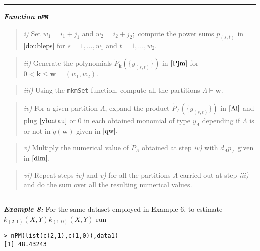 \noindent

\rule{13cm}{0.4pt}

\textbf{\emph{Function \texttt{nPM}}}

\begin{quote}
\emph{i)} Set \(w_1=i_1+j_1\) and \(w_2=i_2+j_2;\) compute the power
sums \(p_{(s,t)}\) in \eqref{doubleps} for \(s=1, \ldots, w_1\) and
\(t=1, \ldots, w_2.\)
\end{quote}

\begin{quote}
\emph{ii)} Generate the polynomials
\(\tilde{P}_{\boldsymbol{k}} \left( \{y_{(s,t)}\} \right)\) in
\(\eqref{Pjm}\) for \(0<\boldsymbol{k} \leq \boldsymbol{w}=(w_1,w_2).\)
\end{quote}

\begin{quote}
\emph{iii)} Using the \texttt{mkmSet} function, compute all the
partitions \(\Lambda \vdash \boldsymbol{w}.\)
\end{quote}

\begin{quote}
\emph{iv)} For a given partition \(\Lambda\), expand the product
\(\tilde{P}_{\Lambda}\left( \{y_{(s,t)}\}\right)\) in \(\eqref{Ai}\) and
plug \(\eqref{ybmtau}\) or \(0\) in each obtained monomial of type
\(y_{\Lambda}\) depending if \(\Lambda\) is or not in
\(\tilde{q}(\boldsymbol{w})\) given in \(\eqref{qw}.\)
\end{quote}

\begin{quote}
\emph{v)} Multiply the numerical value of \(\tilde{P}_{\Lambda}\)
obtained at step \emph{iv)} with \(d_{\Lambda} p_{\Lambda}\) given in
\(\eqref{dlm}.\)
\end{quote}

\begin{quote}
\emph{vi)} Repeat steps \emph{iv)} and \emph{v)} for all the partitions
\(\Lambda\) carried out at step \emph{iii)} and do the sum over all the
resulting numerical values.
\end{quote}

\noindent

\rule{13cm}{0.4pt}

\hskip-0.5cm\textbf{\emph{Example 8:}} For the same dataset employed in
Example 6, to estimate \(k_{(2,1)}(X,Y) k_{(1,0)}(X,Y)\) run

\begin{verbatim}
> nPM(list(c(2,1),c(1,0)),data1)
[1] 48.43243
\end{verbatim}


